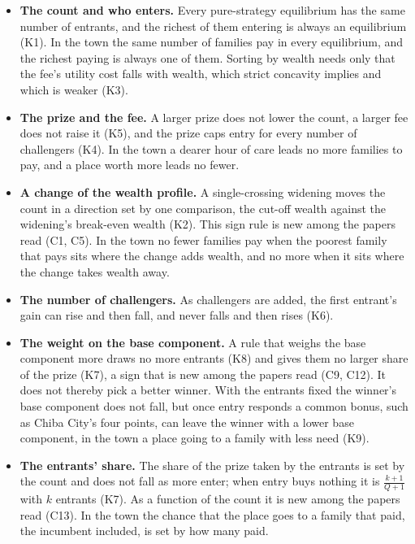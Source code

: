 \begin{itemize}
\item \textbf{The count and who enters.} Every pure-strategy equilibrium has the
  same number of entrants, and the richest of them entering is always an
  equilibrium (K1). In the town the same number of families pay in every
  equilibrium, and the richest paying is always one of them. Sorting by wealth needs only that the fee's utility cost
  falls with wealth, which strict concavity implies and which is weaker (K3).
\item \textbf{The prize and the fee.} A larger prize does not lower the count,
  a larger fee does not raise it (K5), and the prize caps entry for every number
  of challengers (K4). In the town a dearer hour of care leads no more families
  to pay, and a place worth more leads no fewer.
\item \textbf{A change of the wealth profile.} A single-crossing widening moves the
  count in a direction set by one comparison, the cut-off wealth against the
  widening's break-even wealth (K2).
  This sign rule is new among the papers read (C1, C5). In the town no fewer
  families pay when the poorest family that pays sits where the change adds
  wealth, and no more when it sits where the change takes wealth away.
\item \textbf{The number of challengers.} As challengers are added, the first
  entrant's gain can rise and then fall, and never falls and then rises (K6).
\item \textbf{The weight on the base component.} A rule that weighs the base
  component more draws no more entrants (K8) and gives them no larger share of
  the prize (K7), a sign that is new among the papers read (C9, C12). It does
  not thereby pick a better winner. With the entrants fixed the winner's base
  component does not fall, but once entry responds a common bonus, such as
  Chiba City's four points, can leave the winner with a lower base component,
  in the town a place going to a family with less need (K9).
\item \textbf{The entrants' share.} The share of the prize taken by the
  entrants is set by the count and does not fall as more enter; when entry buys
  nothing it is $\frac{k+1}{Q+1}$ with $k$ entrants (K7). As a function of the
  count it is new among the papers read (C13). In the town the chance that the
  place goes to a family that paid, the incumbent included, is set by how many
  paid.
\end{itemize}

